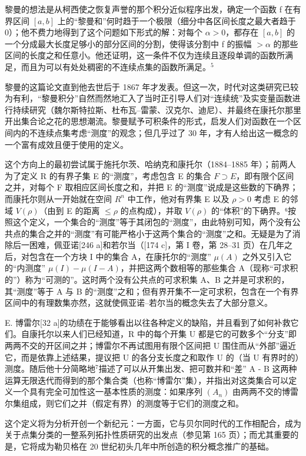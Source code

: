 黎曼的想法是从柯西使之恢复声誉的那个积分近似程序出发，确定一个函数 f 在有界区间 \([a, b]\) 上的“黎曼和”何时趋于一个极限（细分中各区间长度之最大者趋于 0）；他不费力地得到了这个问题如下形式的解：对每个 \(\alpha > 0\)，都存在 \([a, b]\) 的一个分成最大长度足够小的部分区间的分割，使得该分割中 f 的振幅 \(>\alpha\) 的那些区间的长度之和任意小。他还证明，这一条件不仅为连续且逐段单调的函数所满足，而且为可以有处处稠密的不连续点集的函数所满足。\(^{5}\)

黎曼的这篇论文直到他去世后于 1867 年才发表。但这一次，时代对这类研究已较为有利，“黎曼积分”自然而然地汇入了当时正引导人们对“连续统”及实变量函数进行持续研究（魏尔斯特拉斯、杜布瓦–雷蒙、汉克尔、迪尼）、并最终在康托尔那里开出集合论之花的思想潮流。黎曼赋予可积条件的形式，启发人们对函数在一个区间内的不连续点集考虑“测度”的观念；但几乎过了 30 年，才有人给出这一概念的一个富有成效且便于使用的定义。

这个方向上的最初尝试属于施托尔茨、哈纳克和康托尔（1884–1885 年）；前两人为了定义 R 的有界子集 E 的“测度”，考虑包含 E 的集合 \(F \supset E\)，即有限个区间之并，对每个 F 取相应区间长度之和，并把 E 的“测度”说成是这些数的下确界；而康托尔则从一开始就在空间 \(R^{n}\) 中工作，他对有界集 E 以及 \(\rho > 0\) 考虑 E 的邻域 \(V(\rho)\)（由到 E 的距离 \(\leq \rho\) 的点构成），并取 \(V(\rho)\) 的“体积”的下确界。⁶按照这个定义，一个集合的“测度”等于其闭包的“测度”，由此特别可知，两个没有公共点的集合之并的“测度”有可能严格小于这两个集合的“测度”之和。无疑是为了消除后一困难，佩亚诺{[}246 a{]}和若尔当（{[}174 c{]}，第 I 卷，第 28–31 页）在几年之后，对包含在一个方块 I 中的集合 A，在康托尔的“测度” \(\mu(A)\) 之外又引入它的“内测度” \(\mu(I) - \mu(I - A)\)，并把这两个数相等的那些集合 A（现称“可求积的”）称为“可测的”。这时两个没有公共点的可求积集 A、B 之并是可求积的，其“测度”等于 A 与 B 的“测度”之和；但有界开集不一定可求积，包含在一个有界区间中的有理数集亦然，这就使佩亚诺–若尔当的概念失去了大部分意义。

E. 博雷尔{[}32 a{]}的功绩在于能够看出以往各种定义的缺陷，并且看到了如何补救它们。自康托尔以来人们已经知道，R 中的每个开集 U 都是它的可数多个“分支”即两两不交的开区间之并；博雷尔不再试图用有限个区间把 U 围住而从“外部”逼近它，而是依靠上述结果，提议把 U 的各分支长度之和取作 U 的（当 U 有界时的）测度。随后他十分简略地\(^{7}\)描述了可以从开集出发、把可数并和“差” A - B 这两种运算无限迭代而得到的那个集合类（也称“博雷尔”集），并指出对这类集合可以定义一个具有完全可加性这一基本性质的测度：如果序列 \((A_{n})\) 由两两不交的博雷尔集组成，则它们之并（假定有界）的测度等于它们的测度之和。

这个定义将为分析开创一个新纪元：一方面，它与贝尔同时代的工作相配合，成为关于点集分类的一整系列拓扑性质研究的出发点（参见第 165 页）；而尤其重要的是，它将成为勒贝格在 20 世纪初头几年中所创造的积分概念推广的基础。

